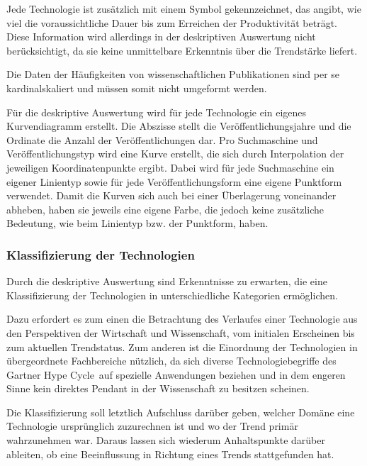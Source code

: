 Jede Technologie ist zusätzlich mit einem Symbol gekennzeichnet, das angibt, wie viel die voraussichtliche Dauer bis zum Erreichen der Produktivität beträgt. Diese Information wird allerdings in der deskriptiven Auswertung nicht berücksichtigt, da sie keine unmittelbare Erkenntnis über die Trendstärke liefert.

Die Daten der Häufigkeiten von wissenschaftlichen Publikationen sind per se kardinalskaliert und müssen somit nicht umgeformt werden.

Für die deskriptive Auswertung wird für jede Technologie ein eigenes Kurvendiagramm erstellt. Die Abszisse stellt die Veröffentlichungsjahre und die Ordinate die Anzahl der Veröffentlichungen dar. Pro Suchmaschine und Veröffentlichungstyp wird eine Kurve erstellt, die sich durch Interpolation der jeweiligen Koordinatenpunkte ergibt. Dabei wird für jede Suchmaschine ein eigener Linientyp sowie für jede Veröffentlichungsform eine eigene Punktform verwendet. Damit die Kurven sich auch bei einer Überlagerung voneinander abheben, haben sie jeweils eine eigene Farbe, die jedoch keine zusätzliche Bedeutung, wie beim Linientyp bzw. der Punktform, haben.

\subsubsection{Klassifizierung der Technologien}
Durch die deskriptive Auswertung sind Erkenntnisse zu erwarten, die eine Klassifizierung der Technologien in unterschiedliche Kategorien ermöglichen.

Dazu erfordert es zum einen die Betrachtung des Verlaufes einer Technologie aus den Perspektiven der Wirtschaft und Wissenschaft, vom initialen Erscheinen bis zum aktuellen Trendstatus. Zum anderen ist die Einordnung der Technologien in übergeordnete Fachbereiche nützlich, da sich diverse Technologiebegriffe des \glqq Gartner Hype Cycle\grqq~auf spezielle Anwendungen beziehen und in dem engeren Sinne kein direktes Pendant in der Wissenschaft zu besitzen scheinen.

Die Klassifizierung soll letztlich Aufschluss darüber geben, welcher Domäne eine Technologie ursprünglich zuzurechnen ist und wo der Trend primär wahrzunehmen war. Daraus lassen sich wiederum Anhaltspunkte darüber ableiten, ob eine Beeinflussung in Richtung eines Trends stattgefunden hat.



